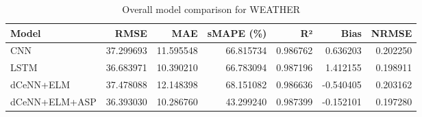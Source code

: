 \begin{table}
\caption{Overall model comparison for WEATHER}
\begin{tabular}{lrrrrrr}
\toprule
Model & RMSE & MAE & sMAPE (\%) & R² & Bias & NRMSE \\
\midrule
CNN & 37.299693 & 11.595548 & 66.815734 & 0.986762 & 0.636203 & 0.202250 \\
LSTM & 36.683971 & 10.390210 & 66.783094 & 0.987196 & 1.412155 & 0.198911 \\
dCeNN+ELM & 37.478088 & 12.148398 & 68.151082 & 0.986636 & -0.540405 & 0.203162 \\
dCeNN+ELM+ASP & 36.393030 & 10.286760 & 43.299240 & 0.987399 & -0.152101 & 0.197280 \\
\bottomrule
\end{tabular}
\end{table}
